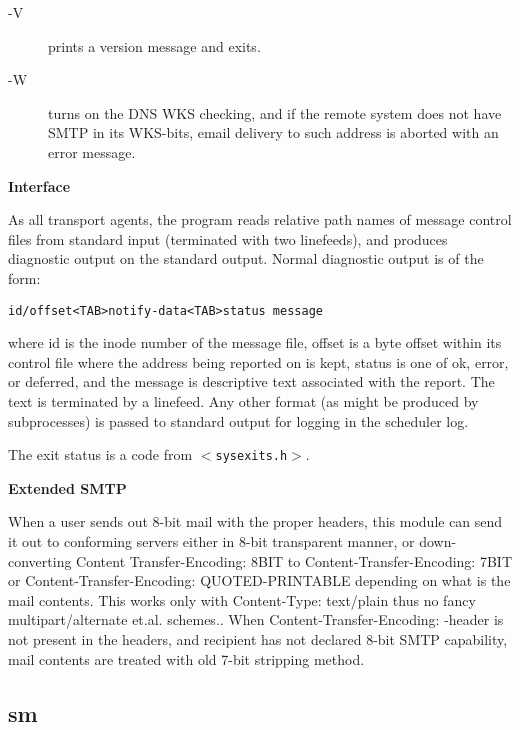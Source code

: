\begin{description}
\item[-V] \mbox{}

prints a version message and exits.



\item[-W] \mbox{}

turns on the DNS WKS checking, and if the remote
system does not have SMTP in its WKS-bits, email
delivery to such address is aborted with an error
message.

\end{description}


{\bf Interface}

As all transport agents, the program reads relative path
names of message control files from standard input 
(terminated with two linefeeds), and produces diagnostic output
on the standard output. Normal diagnostic output is of
the form:

\begin{verbatim}
id/offset<TAB>notify-data<TAB>status message
\end{verbatim}


where id is the inode number of the message file, offset
is a byte offset within its control file where the address
being reported on is kept, status is one of ok, error, or
deferred, and the message is descriptive text associated
with the report. The text is terminated by a linefeed.
Any other format (as might be produced by subprocesses) is
passed to standard output for logging in the scheduler
log.

The exit status is a code from {\tt {\(<\)}sysexits.h{\(>\)}}.

{\bf Extended SMTP}

When a user sends out 8-bit mail with the proper headers, this
module can send it out to conforming servers either in
8-bit transparent manner, or down-converting Content 
Transfer-Encoding: 8BIT to Content-Transfer-Encoding: 7BIT
or Content-Transfer-Encoding: QUOTED-PRINTABLE depending
on what is the mail contents.
This works only with Content-Type: text/plain thus no
fancy multipart/alternate et.al. schemes..
When Content-Transfer-Encoding: -header is not present in
the headers, and recipient has not declared 8-bit SMTP
capability, mail contents are treated with old 7-bit
stripping method.





\subsection{sm}

